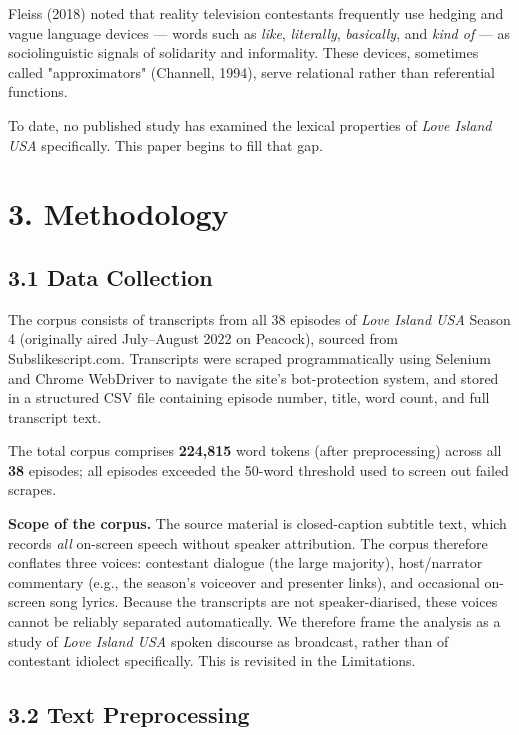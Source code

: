 \documentclass[11pt]{article}
\begin{document}
Fleiss (2018) noted that reality television contestants frequently use hedging and vague language devices --- words such as \emph{like}, \emph{literally}, \emph{basically}, and \emph{kind of} --- as sociolinguistic signals of solidarity and informality. These devices, sometimes called "approximators" (Channell, 1994), serve relational rather than referential functions.

To date, no published study has examined the lexical properties of \emph{Love Island USA} specifically. This paper begins to fill that gap.


\section*{3. Methodology}

\subsection*{3.1 Data Collection}

The corpus consists of transcripts from all 38 episodes of \emph{Love Island USA} Season 4 (originally aired July--August 2022 on Peacock), sourced from Subslikescript.com. Transcripts were scraped programmatically using Selenium and Chrome WebDriver to navigate the site's bot-protection system, and stored in a structured CSV file containing episode number, title, word count, and full transcript text.

The total corpus comprises \textbf{224,815} word tokens (after preprocessing) across all \textbf{38} episodes; all episodes exceeded the 50-word threshold used to screen out failed scrapes.

\textbf{Scope of the corpus.} The source material is closed-caption subtitle text, which records \emph{all} on-screen speech without speaker attribution. The corpus therefore conflates three voices: contestant dialogue (the large majority), host/narrator commentary (e.g., the season's voiceover and presenter links), and occasional on-screen song lyrics. Because the transcripts are not speaker-diarised, these voices cannot be reliably separated automatically. We therefore frame the analysis as a study of \emph{Love Island USA} spoken discourse as broadcast, rather than of contestant idiolect specifically. This is revisited in the Limitations.

\subsection*{3.2 Text Preprocessing}
\end{document}
